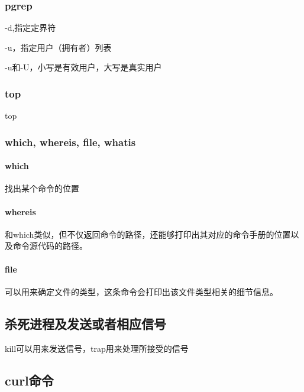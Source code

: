 \subsubsection{pgrep}

-d,指定定界符

-u，指定用户（拥有者）列表

-u和-U，小写是有效用户，大写是真实用户




\subsubsection{top}

top

\subsubsection{which, whereis, file, whatis}

\paragraph{which} 找出某个命令的位置

\paragraph{whereis} 和which类似，但不仅返回命令的路径，还能够打印出其对应的命令手册的位置以及命令源代码的路径。

\paragraph{file} 可以用来确定文件的类型，这条命令会打印出该文件类型相关的细节信息。



\subsection{杀死进程及发送或者相应信号}

kill可以用来发送信号，trap用来处理所接受的信号


\subsection{curl命令}


